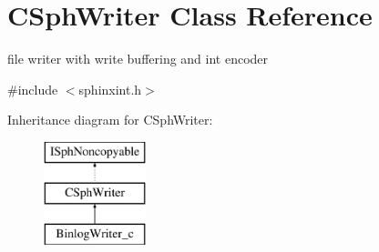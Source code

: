 \hypertarget{classCSphWriter}{\section{C\-Sph\-Writer Class Reference}
\label{classCSphWriter}
}


file writer with write buffering and int encoder  




{\ttfamily \#include $<$sphinxint.\-h$>$}

Inheritance diagram for C\-Sph\-Writer\-:\begin{figure}[H]
\begin{center}
\leavevmode
\includegraphics[height=3.000000cm]{classCSphWriter}
\end{center}
\end{figure}
